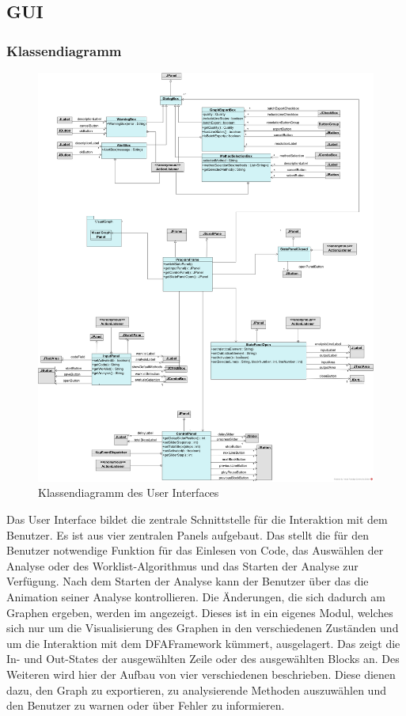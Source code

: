\subsection{GUI}

\subsubsection{Klassendiagramm}

\begin{figure}[htbp] 
  \centering
  		 \includegraphics[width=1\textwidth]{Klassenuebersicht/GUI/GUI}
  \caption{Klassendiagramm des User Interfaces}
  \label{fig:UI}
\end{figure}

Das User Interface bildet die zentrale Schnittstelle für die Interaktion mit dem Benutzer.
Es ist aus vier zentralen Panels aufgebaut. 
Das  stellt die für den Benutzer notwendige Funktion für das Einlesen von Code, das Auswählen der Analyse oder des Worklist-Algorithmus und das Starten der Analyse zur Verfügung. 
Nach dem Starten der Analyse kann der Benutzer über das  die Animation seiner Analyse kontrollieren. 
Die Änderungen, die sich dadurch am Graphen ergeben, werden im  angezeigt. 
Dieses ist in ein eigenes Modul, welches sich nur um die Visualisierung des Graphen in den verschiedenen Zuständen und um die Interaktion mit dem DFAFramework kümmert, ausgelagert. 
Das  zeigt die In- und Out-States der ausgewählten Zeile oder des ausgewählten Blocks an. 
Des Weiteren wird hier der Aufbau von vier verschiedenen  beschrieben. Diese dienen dazu, den Graph zu exportieren, zu analysierende Methoden auszuwählen und den Benutzer zu warnen oder über Fehler zu informieren. 

